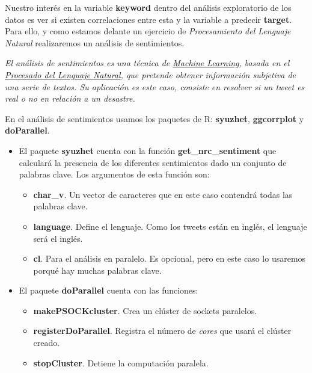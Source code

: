 \documentclass[]{article}
\providecommand{\tightlist}{%
  \setlength{\itemsep}{0pt}\setlength{\parskip}{0pt}}
\begin{document}
Nuestro interés en la variable \textbf{keyword} dentro del análisis
exploratorio de los datos es ver si existen correlaciones entre esta y
la variable a predecir \textbf{target}. Para ello, y como estamos
delante un ejercicio de \emph{Procesamiento del Lenguaje Natural}
realizaremos un análisis de sentimientos.

\emph{El análisis de sentimientos es una técnica de
\href{https://en.wikipedia.org/wiki/Machine_learning}{Machine Learning},
basada en el
\href{https://www.kdnuggets.com/2017/02/natural-language-processing-key-terms-explained.html}{Procesado
del Lenguaje Natural}, que pretende obtener información subjetiva de una
serie de textos. Su aplicación es este caso, consiste en resolver si un
tweet es real o no en relación a un desastre.}

En el análisis de sentimientos usamos los paquetes de R:
\textbf{syuzhet}, \textbf{ggcorrplot} y \textbf{doParallel}.

\begin{itemize}
\tightlist
\item
  El paquete \textbf{syuzhet} cuenta con la función
  \textbf{get\_nrc\_sentiment} que calculará la presencia de los
  diferentes sentimientos dado un conjunto de palabras clave. Los
  argumentos de esta función son:

  \begin{itemize}
  \tightlist
  \item
    \textbf{char\_v}. Un vector de caracteres que en este caso contendrá
    todas las palabras clave.
  \item
    \textbf{language}. Define el lenguaje. Como los tweets están en
    inglés, el lenguaje será el inglés.
  \item
    \textbf{cl}. Para el análisis en paralelo. Es opcional, pero en este
    caso lo usaremos porqué hay muchas palabras clave.
  \end{itemize}
\item
  El paquete \textbf{doParallel} cuenta con las funciones:

  \begin{itemize}
  \tightlist
  \item
    \textbf{makePSOCKcluster}. Crea un clúster de sockets paralelos.
  \item
    \textbf{registerDoParallel}. Registra el número de \emph{cores} que
    usará el clúster creado.
  \item
    \textbf{stopCluster}. Detiene la computación paralela.
  \end{itemize}
\end{itemize}
\end{document}
